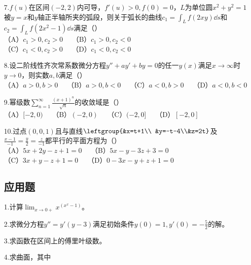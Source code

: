 7.$f(u)$在区间$(-2,2)$内可导，$f'(u)>0,f(0)=0$，$L$为单位圆$x^2+y^2=1$被$y=x$和$y$轴正半轴所夹的弧段，则关于弧长的曲线$c_1=\int_{L}f(2xy)\dd{s}$和$c_2=\int_{L}f(2x^2-1)\dd{s}$满足（）\\
（A）$c_1>0,c_2>0\quad$ （B）$c_1>0,c_2<0$\\
 （C）$c_1<0,c_2>0\quad$ （D）$c_1<0,c_2<0$

8.设二阶线性齐次常系数微分方程$y''+ay'+by=0$的任一$y(x)$满足$x \to \infty$时$y \to 0$，则实数$a,b$满足（）\\
（A）$a>0,b>0\quad$ （B）$a>0,b<0\quad$ （C）$a<0,b>0\quad$ （D）$a<0,b<0$

9.幂级数$\displaystyle \sum_{n=1}^{\infty} \frac{(x+1)^n}{\sqrt{n}}$的收敛域是（）\\
（A）$[-2,0)\quad$ （B）$(-2,0)\quad$ （C）$(-2,0]\quad$ （D）$[-2,0]$

10.过点$(0,0,1)$且与直线$\leftgroup{&x=t+1\\ &y=-t-4\\&z=2t}$及$\frac{x-1}{-1}=\frac{y}{2}=\frac{z}{-1}$都平行的平面方程为（）\\
（A）$5x+2y-z+1=0\quad$ （B）$5x-y-3z+3=0$\\
（C）$3x+y-z+1=0\quad$ （D）$0-3x-y+z+1=0$


\subsection{应用题}
1.计算$\displaystyle \lim_{x \to 0+}x^{(x^x-1)}$。


2.求微分方程$y''=y'(y-3)$满足初始条件$y(0)=1,y'(0)=-\frac{5}{2}$的解。


3.求函数在区间上的傅里叶级数。

4.求曲面，其中


